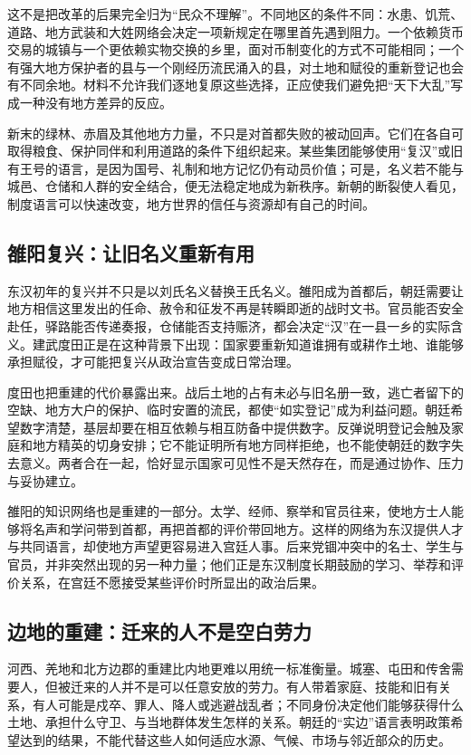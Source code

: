 这不是把改革的后果完全归为“民众不理解”。不同地区的条件不同：水患、饥荒、道路、地方武装和大姓网络会决定一项新规定在哪里首先遇到阻力。一个依赖货币交易的城镇与一个更依赖实物交换的乡里，面对币制变化的方式不可能相同；一个有强大地方保护者的县与一个刚经历流民涌入的县，对土地和赋役的重新登记也会有不同余地。材料不允许我们逐地复原这些选择，正应使我们避免把“天下大乱”写成一种没有地方差异的反应。

新末的绿林、赤眉及其他地方力量，不只是对首都失败的被动回声。它们在各自可取得粮食、保护同伴和利用道路的条件下组织起来。某些集团能够使用“复汉”或旧有王号的语言，是因为国号、礼制和地方记忆仍有动员价值；可是，名义若不能与城邑、仓储和人群的安全结合，便无法稳定地成为新秩序。新朝的断裂使人看见，制度语言可以快速改变，地方世界的信任与资源却有自己的时间。

\subsection{雒阳复兴：让旧名义重新有用}

东汉初年的复兴并不只是以刘氏名义替换王氏名义。雒阳成为首都后，朝廷需要让地方相信这里发出的任命、赦令和征发不再是转瞬即逝的战时文书。官员能否安全赴任，驿路能否传递奏报，仓储能否支持赈济，都会决定“汉”在一县一乡的实际含义。建武度田正是在这种背景下出现：国家要重新知道谁拥有或耕作土地、谁能够承担赋役，才可能把复兴从政治宣告变成日常治理。

度田也把重建的代价暴露出来。战后土地的占有未必与旧名册一致，逃亡者留下的空缺、地方大户的保护、临时安置的流民，都使“如实登记”成为利益问题。朝廷希望数字清楚，基层却要在相互依赖与相互防备中提供数字。反弹说明登记会触及家庭和地方精英的切身安排；它不能证明所有地方同样拒绝，也不能使朝廷的数字失去意义。两者合在一起，恰好显示国家可见性不是天然存在，而是通过协作、压力与妥协建立。

雒阳的知识网络也是重建的一部分。太学、经师、察举和官员往来，使地方士人能够将名声和学问带到首都，再把首都的评价带回地方。这样的网络为东汉提供人才与共同语言，却使地方声望更容易进入宫廷人事。后来党锢冲突中的名士、学生与官员，并非突然出现的另一种力量；他们正是东汉制度长期鼓励的学习、举荐和评价关系，在宫廷不愿接受某些评价时所显出的政治后果。

\subsection{边地的重建：迁来的人不是空白劳力}

河西、羌地和北方边郡的重建比内地更难以用统一标准衡量。城塞、屯田和传舍需要人，但被迁来的人并不是可以任意安放的劳力。有人带着家庭、技能和旧有关系，有人可能是戍卒、罪人、降人或逃避战乱者；不同身份决定他们能够获得什么土地、承担什么守卫、与当地群体发生怎样的关系。朝廷的“实边”语言表明政策希望达到的结果，不能代替这些人如何适应水源、气候、市场与邻近部众的历史。

